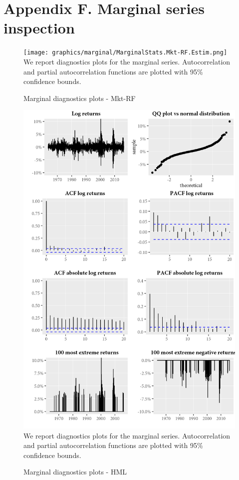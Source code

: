 \section{Appendix F. Marginal series inspection}
\label{App:AppendixF}
\begin{figure}[H]
  \caption{Marginal diagnostics plots - Mkt-RF}
  \label{diag:marginaldiagMkt-RF}
  \centering
  \begin{minipage}{\textwidth}
  \texttt{[image: graphics/marginal/MarginalStats.Mkt-RF.Estim.png]}  
  \vspace{3mm}
  \footnotesize
  We report diagnostics plots for the marginal series. Autocorrelation and partial autocorrelation functions are plotted with 95\% confidence bounds. 
  \end{minipage}
\end{figure}
\begin{figure}[H]
  \caption{Marginal diagnostics plots - HML}
  \label{diag:marginaldiagHML}
  \centering
  \begin{minipage}{\textwidth}
  \includegraphics[scale=1]{graphics/marginal/MarginalStats.HML.Estim.png}  
  \vspace{3mm}
  \footnotesize
  We report diagnostics plots for the marginal series. Autocorrelation and partial autocorrelation functions are plotted with 95\% confidence bounds. 
  \end{minipage}
\end{figure}
